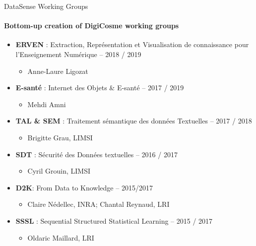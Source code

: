 \begin{frame}{DataSense Working Groups}
  \framesubtitle{Bottom-up creation of DigiCosme working groups}

      \begin{itemize}
       \item {\small \textbf{ERVEN} : Extraction, Repr\'esentation et Visualisation de connaissance pour
l'Enseignement Num\'erique -- 2018 / 2019}
        \begin{itemize}
        \item Anne-Laure Ligozat
        \end{itemize}

        \item \textbf{E-sant\'e} : Internet des Objets \& E-sant\'e -- 2017 / 2019
        \begin{itemize}
        \item Mehdi Amni
        \end{itemize}

        \item \textbf{TAL \& SEM} : Traitement sémantique des données  Textuelles -- 2017 / 2018
        \begin{itemize}
        \item  Brigitte Grau, LIMSI
        \end{itemize}

        \item \textbf{SDT} : S\'ecurit\'e des Donn\'ees textuelles -- 2016 / 2017
        \begin{itemize}
        \item Cyril Grouin,  LIMSI
        \end{itemize}

      \item \textbf{D2K}: From Data to Knowledge -- 2015/2017
        \begin{itemize}
        \item Claire N\'edellec, INRA; Chantal Reynaud, LRI 
        \end{itemize}

        \item \textbf{SSSL} : Sequential Structured Statistical Learning -- 2015 / 2017
          \begin{itemize}
          \item Oldaric Maillard, LRI
          \end{itemize}
      \end{itemize}    
\end{frame}

